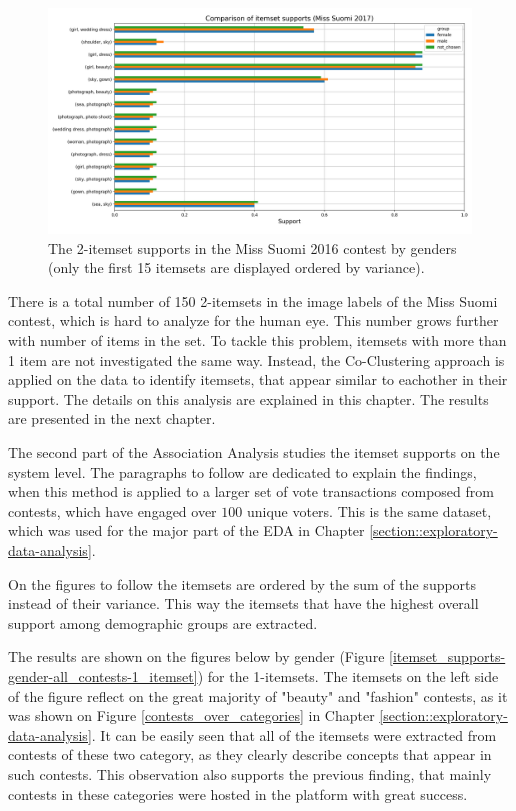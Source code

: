 \begin{figure}[h] 
    \begin{center}
        \includegraphics[width=1.0\textwidth]{Images/itemset_supports-gender-Miss_Helsinki-2_itemset.png}
        \caption{The 2-itemset supports in the Miss Suomi 2016 contest by genders (only the first 15 itemsets are displayed ordered by variance).}
        \label{itemset_supports-gender-Miss_Helsinki-2_itemset}
    \end{center}
\end{figure}

There is a total number of 150 2-itemsets in the image labels of the Miss Suomi contest, which is hard to analyze for the human eye. This number grows further with number of items in the set. To tackle this problem, itemsets with more than 1 item are not investigated the same way. Instead, the Co-Clustering approach is applied on the data to identify itemsets, that appear similar to eachother in their support. The details on this analysis are explained in this chapter. The results are presented in the next chapter.

The second part of the Association Analysis studies the itemset supports on the system level. The paragraphs to follow are dedicated to explain the findings, when this method is applied to a larger set of vote transactions composed from contests, which have engaged over $100$ unique voters. This is the same dataset, which was used for the major part of the EDA in Chapter \ref{section::exploratory-data-analysis}.

On the figures to follow the itemsets are ordered by the sum of the supports instead of their variance. This way the itemsets that have the highest overall support among demographic groups are extracted.

The results are shown on the figures below by gender (Figure \ref{itemset_supports-gender-all_contests-1_itemset}) for the 1-itemsets. The itemsets on the left side of the figure reflect on the great majority of "beauty" and "fashion" contests, as it was shown on Figure \ref{contests_over_categories} in Chapter \ref{section::exploratory-data-analysis}. It can be easily seen that all of the itemsets were extracted from contests of these two category, as they clearly describe concepts that appear in such contests. This observation also supports the previous finding, that mainly contests in these categories were hosted in the platform with great success.

